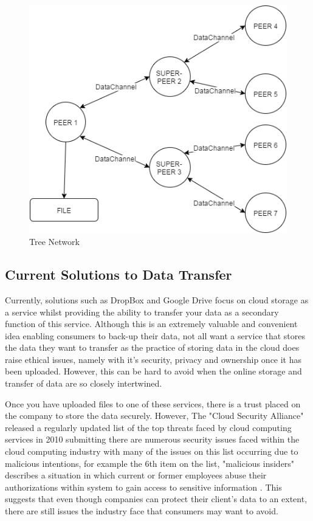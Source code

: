 \documentclass[]{report}
\begin{document}
			\begin{figure}[h!]
				\centering
				\caption{Tree Network}
				\includegraphics[scale=0.4]{treetopology.png}
			\end{figure}			
			\subsection*{Current Solutions to Data Transfer}
			Currently, solutions such as DropBox and Google Drive focus on cloud storage as a service whilst providing the ability to transfer your data as a secondary function of this service. Although this is an extremely valuable and convenient idea enabling consumers to back-up their data, not all want a service that stores the data they want to transfer as the practice of storing data in the cloud does raise ethical issues, namely with it's security, privacy and ownership once it has been uploaded. However, this can be hard to avoid when the online storage and transfer of data are so closely intertwined.
			
			Once you have uploaded files to one of these services, there is a trust placed on the company to store the data securely. However, The "Cloud Security Alliance" released a regularly updated list of the top threats faced by cloud computing services in 2010 submitting there are numerous security issues faced within the cloud computing industry with many of the issues on this list occurring due to malicious intentions, for example the 6th item on the list, "malicious insiders" describes a situation in which current or former employees abuse their authorizations within system to gain access to sensitive information \cite{CSA Top Threats}. This suggests that even though companies can protect their client's data to an extent, there are still issues the industry face that consumers may want to avoid.
		 
\end{document}
